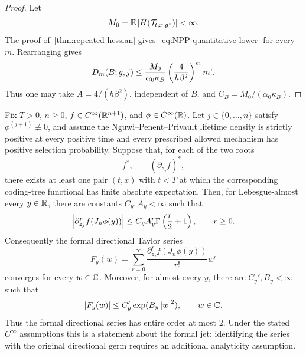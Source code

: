 \begin{proof}
Let
\begin{equation*}
  M_0
  =
  \mathbb E\left|H(\mathcal T_{t,x,g^*})\right|
  <\infty.
\end{equation*}
The proof of~\cref{thm:repeated-hessian} gives~\eqref{eq:NPP-quantitative-lower} for every $m$. Rearranging gives
\begin{equation*}
  D_m(B;g,j)
  \leq
  \frac{M_0}{\alpha_0\kappa_B}
  \left(\frac4{h\beta^2}\right)^m
  m!.
\end{equation*}
Thus one may take $A=4/(h\beta^2)$, independent of $B$, and $C_B=M_0/(\alpha_0\kappa_B)$.
\end{proof}

\begin{theorem}
\label{thm:gevrey-necessity}
Fix $T>0$, $n\geq0$, $f\in C^\infty(\mathbb R^{n+1})$, and $\phi\in C^\infty(\mathbb R)$. Let $j\in\{0,\ldots,n\}$ satisfy $\phi^{(j+1)}\not\equiv0$, and assume the Nguwi--Penent--Privault lifetime density is strictly positive at every positive time and every prescribed allowed mechanism has positive selection probability. Suppose that, for each of the two roots
\begin{equation*}
  f^*,
  \qquad
  (\partial_{z_j}f)^*,
\end{equation*}
there exists at least one pair $(t,x)$ with $t<T$ at which the corresponding coding-tree functional has finite absolute expectation. Then, for Lebesgue-almost every $y\in\mathbb R$, there are constants $C_y,A_y<\infty$ such that
\begin{equation}
  \left|\partial_{z_j}^r f(J_n\phi(y))\right|
  \leq
  C_yA_y^r\Gamma\left(\frac r2+1\right),
  \qquad r\geq0.
  \label{eq:gevrey-half}
\end{equation}
Consequently the formal directional Taylor series
\begin{equation*}
  F_y(w)
  =
  \sum_{r=0}^\infty
  \frac{\partial_{z_j}^r f(J_n\phi(y))}{r!}w^r
\end{equation*}
converges for every $w\in\mathbb C$. Moreover, for almost every $y$, there are $C_y',B_y<\infty$ such that
\begin{equation}
  \left|F_y(w)\right|
  \leq
  C_y'\exp(B_y\left|w\right|^2),
  \qquad w\in\mathbb C.
  \label{eq:gaussian-entire-growth}
\end{equation}
Thus the formal directional series has entire order at most $2$. Under the stated $C^\infty$ assumptions this is a statement about the formal jet; identifying the series with the original directional germ requires an additional analyticity assumption.
\end{theorem}

